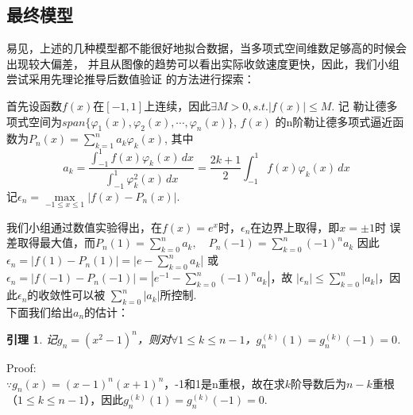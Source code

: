 \documentclass{article}
\newtheorem{lemma}[theorem]{引理}
\begin{document}
    \subsection{最终模型}
    易见，上述的几种模型都不能很好地拟合数据，当多项式空间维数足够高的时候会出现较大偏差，
    并且从图像的趋势可以看出实际收敛速度更快，因此，我们小组尝试采用先理论推导后数值验证
    的方法进行探索：
    
    首先设函数$f(x)$在$[-1,1]$上连续，因此$\exists M>0, s.t. |f(x)|\leqslant M $. 记
    勒让德多项式空间为$span\{\varphi_1(x),\varphi_2(x),\cdots,\varphi_n(x)\}$, $f(x)$
    的n阶勒让德多项式逼近函数为$P_n(x)=\sum_{k=1}^{n} a_k\varphi_k(x) $, 其中
    $$a_k=\frac{\int_{-1}^{1} f(x)\varphi_k(x)\,dx}{\int_{-1}^{1} \varphi_k^2(x)\,dx}
    =\frac{2k+1}{2}\int_{-1}^{1} f(x)\varphi_k(x)\,dx
    $$
    记$\epsilon_n=\mathop{max}\limits_{-1\leqslant x\leqslant 1}|f(x)-P_n(x)|$.\\
    \par
    我们小组通过数值实验得出，在$f(x)=e^x$时，$\epsilon_n$在边界上取得，即$x=\pm 1$时
    误差取得最大值，而$P_n(1)=\sum_{k=0}^{n} a_k,\quad P_n(-1)=\sum_{k=0}^{n} (-1)^n a_k$
    因此$\epsilon_n=|f(1)-P_n(1)|=|e-\sum_{k=0}^{n} a_k$| 或 
    $ \epsilon_n=|f(-1)-P_n(-1)|=|e^{-1}-\sum_{k=0}^{n} (-1)^n a_k|$，故
    $|\epsilon_n|\leqslant \sum_{k=0}^{n} |a_k|$，因此$\epsilon_n$的收敛性可以被
    $\sum_{k=0}^{n} |a_k|$所控制.\\
    下面我们给出$a_n$的估计：\\
    \begin{lemma}
        记$g_n=(x^2-1)^n$，则对$\forall 1\leqslant k \leqslant n-1$，$g_n^{(k)}(1)=
        g_n^{(k)}(-1)=0$.
    \end{lemma}
    Proof:\\
    $\because g_n(x)=(x-1)^n(x+1)^n$，-1和1是n重根，故在求$k$阶导数后为$n-k$重根
    （$1\leqslant k \leqslant n-1$），因此$g_n^{(k)}(1)=g_n^{(k)}(-1)=0$.\\
\end{document}
